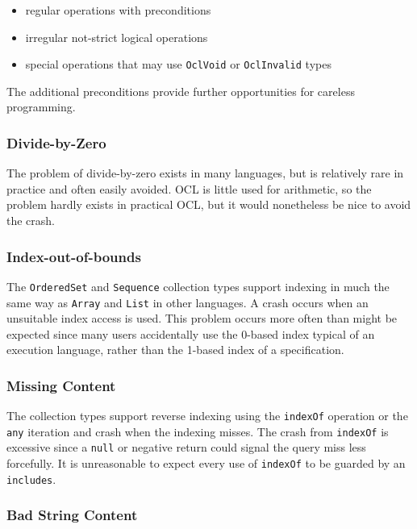 \documentclass[
]{ceurart}
\begin{document}
\begin{itemize}
	\item regular operations with preconditions
	\item irregular not-strict logical operations
	\item special operations that may use \verb|OclVoid| or \verb|OclInvalid| types
\end{itemize}

The additional preconditions provide further opportunities for careless programming.


\subsubsection{Divide-by-Zero}

The problem of divide-by-zero exists in many languages, but is relatively rare in practice and often easily avoided. OCL is little used for arithmetic, so the problem hardly exists in practical OCL, but it would nonetheless be nice to avoid the crash.

\subsubsection{Index-out-of-bounds}

The \verb|OrderedSet| and \verb|Sequence| collection types support indexing in much the same way as \verb|Array| and \verb|List| in other languages. A crash occurs when an unsuitable index access is used. This problem occurs more often than might be expected since many users accidentally use the 0-based index typical of an execution language, rather than the 1-based index of a specification.

\subsubsection{Missing Content}

The collection types support reverse indexing using the \verb|indexOf| operation or the \verb|any| iteration and crash when the indexing misses. The crash from \verb|indexOf| is excessive since a \verb|null| or negative return could signal the query miss less forcefully. It is unreasonable to expect every use of \verb|indexOf| to be guarded by an \verb|includes|.

\subsubsection{Bad String Content}
\end{document}
